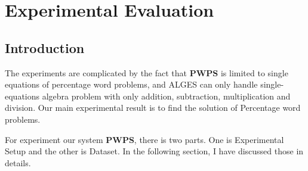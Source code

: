 \documentclass[document.tex]{subfiles}
\begin{document}
\chapter{Experimental Evaluation}
\section{Introduction}
The experiments are complicated by the fact that \textbf{PWPS} is limited to single equations of percentage word problems, and ALGES
can only handle single-equations algebra problem with only addition, subtraction, multiplication and division. Our main experimental result is to find the solution of Percentage word problems.

For experiment our system \textbf{PWPS}, there is two parts. One is Experimental Setup and the other is Dataset. In the following section, I have discussed those in details.
\end{document}
